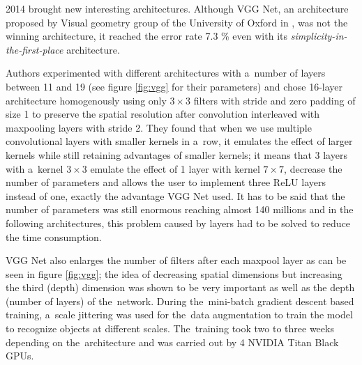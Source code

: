  2014 brought new interesting architectures. Although VGG Net, an 
architecture proposed by Visual geometry group of the University of Oxford in 
\cite{vgg}, was not the winning architecture, it reached the error rate 7.3 \% 
even with its \textit{simplicity-in-the-first-place} architecture.

Authors experimented with different architectures with a~number of layers between 
11 and 19 (see figure \ref{fig:vgg} for their parameters) and chose 16-layer 
architecture homogenously using only $3 \times 3$ filters with stride and zero 
padding of size 1 to preserve the spatial resolution after convolution 
interleaved with maxpooling layers with stride 2. They found that when we use 
multiple convolutional layers with smaller kernels in a~row, it emulates the 
effect of larger kernels while still retaining advantages of smaller kernels; it 
means that 3 layers with a~kernel $3 \times 3$ emulate the effect of 1 layer with 
kernel $7 \times 7$, decrease the number of parameters and allows the user to 
implement three ReLU layers instead of one, exactly the advantage VGG Net used. 
It has to be said that the number of parameters was still enormous reaching 
almost 140 millions and in the following architectures, this problem caused by 
 layers had to be solved to reduce the time consumption.

VGG Net also enlarges the number of filters after each maxpool layer as can be 
seen in figure \ref{fig:vgg}; the idea of decreasing spatial dimensions but 
increasing the third (depth) dimension was shown to be very important as well as 
the depth (number of layers) of the~network. During the~mini-batch gradient 
descent based training, a~scale jittering was used for the~data augmentation to 
train the model to recognize objects at different scales. The~training took two 
to three weeks depending on the~architecture and was carried out by 4 NVIDIA 
Titan Black GPUs.

